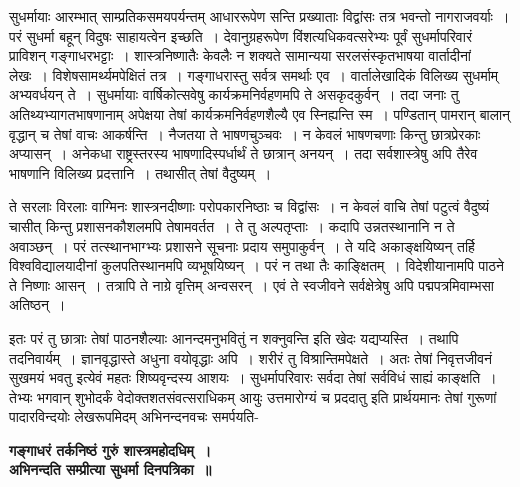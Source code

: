 {सुधर्मायाः आरम्भात् साम्प्रतिकसमयपर्यन्तम् आधाररूपेण सन्ति प्रख्याताः विद्वांसः तत्र भवन्तो नागराजवर्याः~। परं सुधर्मा बहून् विदुषः साहायत्वेन इच्छति~। देवानुग्रहरूपेण विंशत्यधिकवत्सरेभ्यः पूर्वं सुधर्मापरिवारं प्राविशन् गङ्गाधरभट्टाः~। शास्त्रनिष्णातैः केवलैः न शक्यते सामान्यया सरलसंस्कृतभाषया वार्तादीनां लेखः~। विशेषसामर्थ्यमपेक्षितं तत्र~। गङ्गाधरास्तु सर्वत्र समर्थाः एव~। वार्तालेखादिकं विलिख्य सुधर्माम् अभ्यवर्धयन् ते~। सुधर्मायाः वार्षिकोत्सवेषु कार्यक्रमनिर्वहणमपि ते असकृदकुर्वन्~। तदा जनाः तु अतिथ्यभ्यागतभाषणानाम् अपेक्षया तेषां कार्यक्रमनिर्वहणशैल्यै एव स्निह्यन्ति स्म~। पण्डितान् पामरान् बालान् वृद्धान् च तेषां वाचः आकर्षन्ति~। नैजतया ते भाषणचुञ्चवः~। न केवलं भाषणचणाः किन्तु छात्रप्रेरकाः अप्यासन्~। अनेकधा राष्ट्रस्तरस्य भाषणादिस्पर्धार्थं ते छात्रान् अनयन्~। तदा सर्वशास्त्रेषु अपि तैरेव भाषणानि विलिख्य प्रदत्तानि~। तथासीत् तेषां वैदुष्यम्~। 

ते सरलाः विरलाः वाग्मिनः शास्त्रनदीष्णाः परोपकारनिष्ठाः च विद्वांसः~। न केवलं वाचि तेषां पटुत्वं वैदुष्यं चासीत् किन्तु प्रशासनकौशलमपि तेषामवर्तत~। ते तु अल्पतृप्ताः~। कदापि उन्नतस्थानानि न ते अवाञ्छन्~। परं तत्स्थानभाग्भ्यः प्रशासने सूचनाः प्रदाय समुपाकुर्वन्~। ते यदि अकाङ्क्षयिष्यन् तर्हि विश्वविद्यालयादीनां कुलपतिस्थानमपि व्यभूषयिष्यन्~। परं न तथा तैः काङ्क्षितम्~। विदेशीयानामपि पाठने ते निष्णाः आसन्~। तत्रापि ते नाग्रे वृत्तिम् अन्वसरन्~। एवं ते स्वजीवने सर्वक्षेत्रेषु अपि पद्मपत्रमिवाम्भसा अतिष्ठन्~। 

इतः परं तु छात्राः तेषां पाठनशैल्याः आनन्दमनुभवितुं न शक्नुवन्ति इति खेदः यद्यप्यस्ति~। तथापि तदनिवार्यम्~। ज्ञानवृद्धास्ते अधुना वयोवृद्धाः अपि~। शरीरं तु विश्रान्तिमपेक्षते~। अतः तेषां निवृत्तजीवनं सुखमयं भवतु इत्येवं महतः शिष्यवृन्दस्य आशयः~। सुधर्मापरिवारः सर्वदा तेषां सर्वविधं साह्यं काङ्क्षति~। तेभ्यः भगवान् शुभोदर्कं वेदोक्तशतसंवत्सराधिकम् आयुः उत्तमारोग्यं च प्रददातु इति प्रार्थयमानः तेषां गुरूणां पादारविन्दयोः लेखरूपमिदम्  अभिनन्दनवचः समर्पयति-

\begin{center}
\textbf{गङ्गाधरं तर्कनिष्ठं गुरुं शास्त्रमहोदधिम्~।\\
अभिनन्दति सम्प्रीत्या सुधर्मा दिनपत्रिका~॥}
\end{center}

\articleend

}
